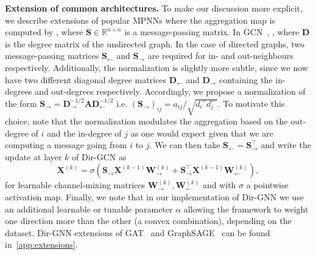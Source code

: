 \documentclass{article}
\newcommand{\inp}{\leftarrow}
\newcommand{\out}{\rightarrow}
\newcommand\oursacro{Dir-GNN}
\newcommand{\R}{\mathbb{R}}
\newcommand\m{m}
\theoremstyle{plain}
\theoremstyle{definition}
\theoremstyle{remark}
\begin{document}
\textbf{Extension of common architectures.}
To make our discussion more explicit, we describe extensions of popular MPNNs where the aggregation map is computed by \smash{$\mathbf{\m}^{(k)}_i = (\mathbf{S}\mathbf{x}^{(k-1)})_i$}, where $\mathbf{S}\in\R^{n\times n}$ is a message-passing matrix. In GCN~\cite{kipf2016semi}, , where $\mathbf{D}$ is the degree matrix of the undirected graph. In the case of directed graphs, two message-passing matrices $\mathbf{S}_\inp$ and $\mathbf{S}_\out$ are required for in- and out-neighbours respectively. Additionally, the normalization is slightly more subtle, since we now have two different diagonal degree matrices $\mathbf{D}_{\inp}$ and $\mathbf{D}_{\out}$ containing the in-degrees and out-degrees respectively. Accordingly, we propose a normalization of the form $\mathbf{S}_{\out} = \mathbf{D}_{\out}^{-1/2}\mathbf{A}\mathbf{D}_{\inp}^{-1/2}$ i.e. $(\mathbf{S}_{\out})_{ij} = a_{ij}/\sqrt{d^{\out}_{i}d^{\inp}_j}$. To motivate this choice, note that the normalization modulates the aggregation based on the out-degree of $i$ and the in-degree of $j$ as one would expect given that we are computing a message going from $i$ to $j$. We can then take $\mathbf{S}_{\inp} = \mathbf{S}_{\out}^\top$ and write the update at layer $k$ of Dir-GCN as 
\begin{equation}\label{eq:dir-gcn}
    \mathbf{X}^{(k)} =  \sigma\left(\mathbf{S}_{\out}\mathbf{X}^{(k-1)}\mathbf{W}^{(k)}_{\out} + \mathbf{S}^\top_{\out}\mathbf{X}^{(k-1)}\mathbf{W}^{(k)}_{\inp}\right), 
\end{equation}
\noindent for learnable channel-mixing matrices $\mathbf{W}^{(k)}_{\out}, \mathbf{W}^{(k)}_{\inp}$ and with $\sigma$ a pointwise activation map. Finally, we note that in our implementation of \oursacro{} we use an additional learnable or tunable parameter $\alpha$ allowing the framework to weight one direction more than the other (a convex combination), depending on the dataset. \oursacro{} extensions of GAT~\cite{velivckovic2017graph} and GraphSAGE~\cite{hamilton2017inductive} can be found in~\cref{app:extensions}. 
\end{document}
